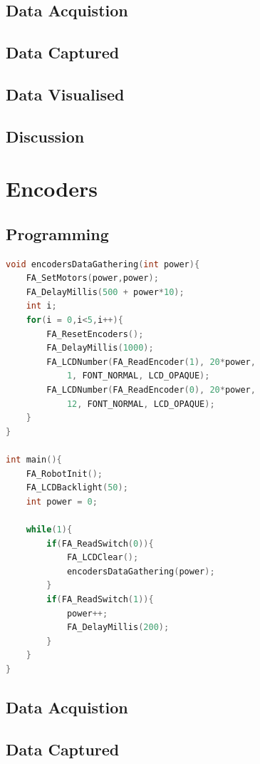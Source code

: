 \documentclass[11pt,a4paper,titlepage]{article}
\begin{document}
\subsection{Data Acquistion}
\subsection{Data Captured}
\subsection{Data Visualised}

\subsection{Discussion}

\section{Encoders}
\subsection{Programming}
\begin{lstlisting}[language=C,frame=single]
void encodersDataGathering(int power){
	FA_SetMotors(power,power);
	FA_DelayMillis(500 + power*10);
	int i;
	for(i = 0,i<5,i++){
		FA_ResetEncoders();
		FA_DelayMillis(1000);
		FA_LCDNumber(FA_ReadEncoder(1), 20*power, 
			1, FONT_NORMAL, LCD_OPAQUE);
		FA_LCDNumber(FA_ReadEncoder(0), 20*power, 
			12, FONT_NORMAL, LCD_OPAQUE);
	}
}

int main(){
	FA_RobotInit();
	FA_LCDBacklight(50);
	int power = 0;
	
	while(1){  
		if(FA_ReadSwitch(0)){
			FA_LCDClear();
			encodersDataGathering(power);
		}
		if(FA_ReadSwitch(1)){
			power++;
			FA_DelayMillis(200);
		}
	}
}

\end{lstlisting}
\subsection{Data Acquistion}
\subsection{Data Captured}
\end{document}
